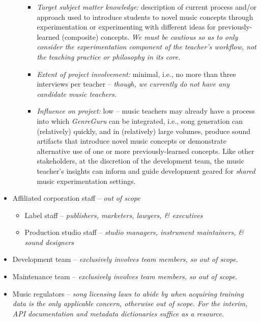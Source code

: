 \documentclass[12pt]{article}
\begin{document}
\begin{itemize}
\begin{itemize}
    \begin{itemize}
      \item \emph{Target subject matter knowledge:} description of current process and/or approach used to introduce students to novel music concepts through experimentation or experimenting with different ideas for previously-learned (composite) concepts. \emph{We must be cautious so as to only consider the experimentation component of the teacher's workflow, not the teaching practice or philosophy in its core.}
      \item \emph{Extent of project involvement:} minimal, i.e., no more than three interviews per teacher -- \emph{though, we currently do not have any candidate music teachers}.
      \item \emph{Influence on project:} low -- music teachers may already have a process into which \emph{GenreGuru} can be integrated, i.e., song generation can (relatively) quickly, and in (relatively) large volumes, produce sound artifacts that introduce novel music concepts or demonstrate alternative use of one or more previously-learned concepts. Like other stakeholders, at the discretion of the development team, the music teacher's insights can inform and guide development geared for \emph{shared} music experimentation settings.
    \end{itemize}
  \end{itemize}
  \item Affiliated corporation staff -- \emph{out of scope}
  \begin{itemize}
    \item Label staff -- \emph{publishers, marketers, lawyers, \& executives}
    \item Production studio staff -- \emph{studio managers, instrument maintainers, \& sound designers}
  \end{itemize}
  \item Development team -- \emph{exclusively involves team members, so out of scope}.
  \item Maintenance team -- \emph{exclusively involves team members, so out of scope}.
  \item Music regulators -- \emph{song licensing laws to abide by when acquiring training data is the only applicable concern, otherwise out of scope. For the interim, API documentation and metadata dictionaries suffice as a resource.}
\end{itemize}
\end{document}
